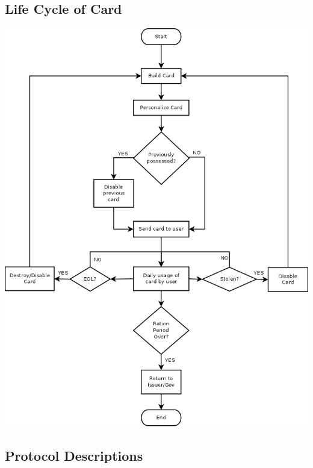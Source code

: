 \subsection{Life Cycle of Card}
\includegraphics[width=\textwidth]{SCLifeCycle}

\subsection{Protocol Descriptions}

